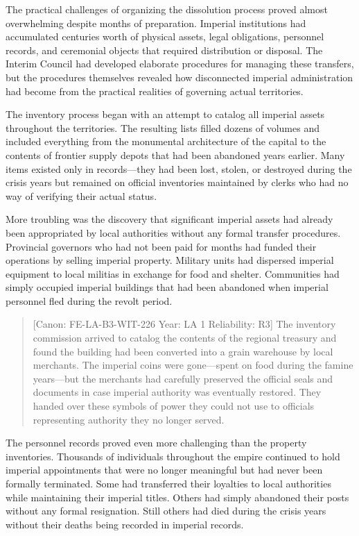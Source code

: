 The practical challenges of organizing the dissolution process proved
almost overwhelming despite months of preparation. Imperial institutions
had accumulated centuries\textquotesingle{} worth of physical assets,
legal obligations, personnel records, and ceremonial objects that
required distribution or disposal. The Interim Council had developed
elaborate procedures for managing these transfers, but the procedures
themselves revealed how disconnected imperial administration had become
from the practical realities of governing actual territories.

The inventory process began with an attempt to catalog all imperial
assets throughout the territories. The resulting lists filled dozens of
volumes and included everything from the monumental architecture of the
capital to the contents of frontier supply depots that had been
abandoned years earlier. Many items existed only in records---they had
been lost, stolen, or destroyed during the crisis years but remained on
official inventories maintained by clerks who had no way of verifying
their actual status.

More troubling was the discovery that significant imperial assets had
already been appropriated by local authorities without any formal
transfer procedures. Provincial governors who had not been paid for
months had funded their operations by selling imperial property.
Military units had dispersed imperial equipment to local militias in
exchange for food and shelter. Communities had simply occupied imperial
buildings that had been abandoned when imperial personnel fled during
the revolt period.

\begin{quote}
{[}Canon: FE-LA-B3-WIT-226 \textbar{} Year: LA 1 \textbar{} Reliability:
R3{]} The inventory commission arrived to catalog the contents of the
regional treasury and found the building had been converted into a grain
warehouse by local merchants. The imperial coins were gone---spent on
food during the famine years---but the merchants had carefully preserved
the official seals and documents in case imperial authority was
eventually restored. They handed over these symbols of power they could
not use to officials representing authority they no longer served.
\end{quote}

The personnel records proved even more challenging than the property
inventories. Thousands of individuals throughout the empire continued to
hold imperial appointments that were no longer meaningful but had never
been formally terminated. Some had transferred their loyalties to local
authorities while maintaining their imperial titles. Others had simply
abandoned their posts without any formal resignation. Still others had
died during the crisis years without their deaths being recorded in
imperial records.

